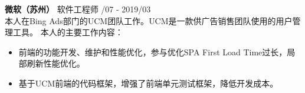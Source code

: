 \documentclass[a4paper]{article}
\newenvironment{changemargin}[2]{%
  \begin{list}{}{%
    \setlength{\topsep}{0pt}%
    \setlength{\leftmargin}{#1}%
    \setlength{\rightmargin}{#2}%
    \setlength{\listparindent}{\parindent}%
    \setlength{\itemindent}{\parindent}%
    \setlength{\parsep}{\parskip}%
  }%
  \item[]}{\end{list}
}
\newenvironment{body} {
	\vspace*{-16pt}
	\begin{changemargin}{-0.5in}{-0.5in}
  }	
	{\end{changemargin}
}
\begin{document}
\begin{body}
	\vspace{10pt}
	\textbf{微软（苏州）} \hfill 软件工程师 {/07 - 2019/03}\\ 
	\smallskip
	本人在{\fontarial Bing Ads}部门的{\fontarial UCM}团队工作。{\fontarial UCM}是一款供广告销售团队使用的用户管理工具。%
	本人的主要工作内容：\\ 
	\vspace*{-6pt}
	\begin{itemize} \itemsep -0pt  %
		\item 前端的功能开发、维护和性能优化，参与优化{\fontarial SPA First Load Time}过长，局部刷新性能优化。\\
	\end{itemize}
	\vspace*{-12pt}
	\begin{itemize} \itemsep -0pt  %
		\item 基于{\fontarial UCM}前端的代码框架，增强了前端单元测试框架，降低开发成本。\\

\end{itemize}
\end{body}
\end{document}
